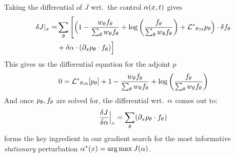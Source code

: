 \documentclass{article}
\begin{document}
Taking the differential of $J$ wrt.\ the control ${\alpha}(x,t)$ gives
\begin{align*}
\delta J|_{x} =&
\sum_{\theta} \Bigg[\Big(
1 - \frac{  w_{\theta} { f_{\theta}} }{\sum_{\theta} w_{\theta}{ f_{\theta}}} 
+ \log\left(\frac{f_{\theta}} {\sum_{\theta} { w_{\theta} } { f_{\theta}} }\right)   
+  { { \mathcal{L} }^* }_{{\theta};{\alpha}} p_{\theta}
\Big)  \cdot { \delta f_{\theta}} 
\\
&+ \delta {\alpha} \cdot ({\partial}_x { p_{\theta}} \cdot { f_{\theta}})
\Big]
\end{align*}
This gives us the differential equation for the adjoint $p$
\begin{equation}
0 = 
{ { \mathcal{L} }^* }_{{\theta};{\alpha}} [p_{\theta}] +  
1 - \frac{  w_{\theta} { f_{\theta}} }{\sum_{\theta} w_{\theta}{ f_{\theta}}} 
+ \log\left(\frac{f_{\theta}} {\sum_{\theta} { w_{\theta} } { f_{\theta}} }\right)   
\end{equation}
And once ${ p_{\theta}}, { f_{\theta}}$ are solved for, the differential wrt.\ ${\alpha}$ comes
out to:
\begin{equation}
\frac {\delta J}{\delta {\alpha}} \Big|_{x} = \sum_{\theta} ({\partial}_x { p_{\theta}} \cdot { f_{\theta}})
\label{eq:differential_objective_stationary_wrt_control_final}
\end{equation}
 forms the key ingredient
in our gradient search for the most informative {\sl stationary} perturbation
$\a^*(x) = \argmax J(\a)$.
% 
% 
\end{document}
